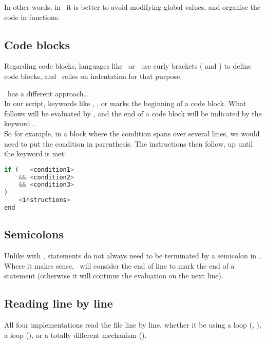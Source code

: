 \bigskip
\bigskip

In other words, in \julia\ it is better to avoid modifying global values, and organise the code in functions. \\



\subsection*{Code blocks}

Regarding code blocks, languages like \awk\ or \perl\ use curly brackets ( \cmd{\{} and \cmd{\}} ) to define code blocks, and \python\ relies on indentation for that purpose.

\julia\ has a different approach\dots \\


In our script, keywords like , , or  marks the beginning of a code block. What follows will be evaluated by \julia, and the end of a code block will be indicated by the keyword . \\

So for example, in a  block where the condition spans over several lines, we would need to put the condition in parenthesis. The instructions then follow, up until the  keyword is met:

\begin{lstlisting}[language=python]
if (   <condition1>
    && <condition2>
    && <condition3>
)
	<instructions>
end
\end{lstlisting}



\subsection*{Semicolons}

Unlike with \perl, statements do not always need to be terminated by a semicolon in \julia. Where it makes sense, \julia\ will consider the end of line to mark the end of a statement (otherwise it will continue the evaluation on the next line). \\

\newpage

\subsection*{Reading line by line}

All four implementations read the file line by line, whether it be using a  loop (\python, \julia), a  loop (\perl), or a totally different mechanism (\awk). \\


